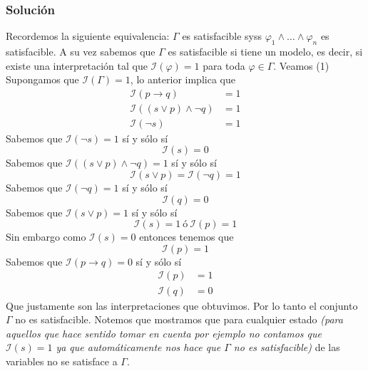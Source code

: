 \documentclass[a4paper]{article}
\begin{document}
\subsubsection{Solución}
\noindent
Recordemos la siguiente equivalencia:
\newline
$\Gamma$ es satisfacible syss $\varphi_1\land\ldots\land\varphi_n$ es
satisfacible.
\newline 
A su vez sabemos que \(\Gamma\) es satisfacible si tiene un modelo, es decir, si existe una 
interpretaci\'on tal que $\mathcal{I}(\varphi)=1$ para toda 
$\varphi\in\Gamma$.
\newline 
Veamos (1)
\newline
Supongamos que \(\mathcal{I}\left(\Gamma\right) = 1\), lo anterior implica que
\begin{align*}
    \mathcal{I} \left(p \to q \right)  &= 1 \\
    \mathcal{I} \left((s \lor p) \land \lnot q \right) &= 1 \\
    \mathcal{I} \left(\lnot s\right)  &= 1
\end{align*}
Sabemos que \(\mathcal{I} \left(\lnot s\right) = 1\) sí y sólo sí
\[
    \mathcal{I} \left(s\right) = 0
\]
Sabemos que \(\mathcal{I} \left((s \lor p) \land \lnot q \right) = 1\) sí y sólo sí
\[
    \mathcal{I} \left(s \lor p \right) =  \mathcal{I} \left(\lnot q \right) = 1
\]
Sabemos que \(\mathcal{I} \left(\lnot q \right) = 1\) sí y sólo sí
\[
    \mathcal{I} \left( q \right) = 0
\]
Sabemos que \(\mathcal{I} \left(s \lor p \right) = 1\) sí y sólo sí
\[
    \mathcal{I} \left(s \right) = 1 \ \text{ó} \ \mathcal{I} \left( p \right) = 1
\]
Sin embargo como \(\mathcal{I} \left(s\right) = 0\) entonces tenemos que
\[
    \mathcal{I} \left( p \right) = 1
\]
Sabemos que \(\mathcal{I} \left(p \to q \right) = 0\) sí y sólo sí
\begin{align*}
    \mathcal{I} \left(p\right) &= 1 \\
    \mathcal{I} \left(q\right) &= 0
\end{align*}
Que justamente son las interpretaciones que obtuvimos. Por lo tanto el conjunto \(\Gamma\) no 
es satisfacible. Notemos que mostramos que para cualquier estado \textit{(para aquellos que hace sentido tomar en cuenta
por ejemplo no contamos que \(\mathcal{I}\left(s\right) = 1\) ya que automáticamente nos hace que \(\Gamma\) no 
es satisfacible)} de las variables no se satisface a \(\Gamma\).
\end{document}

